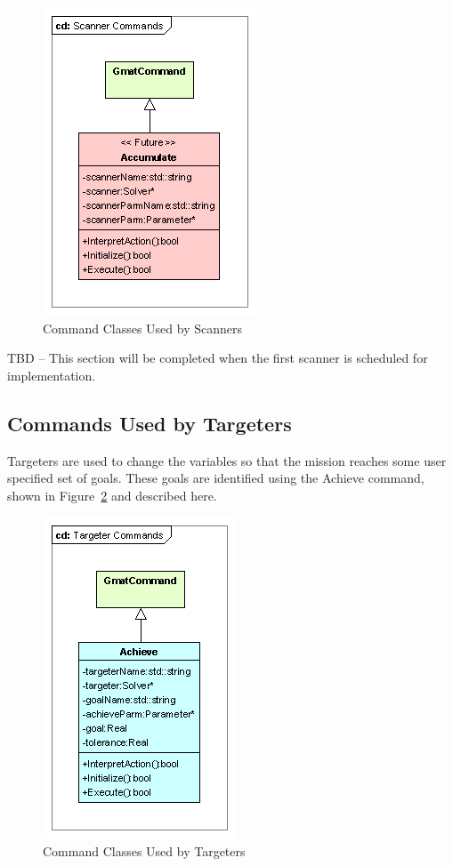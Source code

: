 \begin{figure}[htb]
\begin{center}
\includegraphics[120,174]{Images/ScannerCommands.png}
\caption{\label{figure:ScannerCommands}Command Classes Used by Scanners}
\end{center}
\end{figure}

TBD -- This section will be completed when the first scanner is scheduled for implementation.

\subsection{Commands Used by Targeters}

Targeters are used to change the variables so that the mission reaches some user specified set of
goals.  These goals are identified using the Achieve command, shown in
Figure~\ref{figure:TargeterCommands} and described here.

\begin{figure}[htb]
\begin{center}
\includegraphics[106,173]{Images/TargeterCommands.png}
\caption{\label{figure:TargeterCommands}Command Classes Used by Targeters}
\end{center}
\end{figure}

